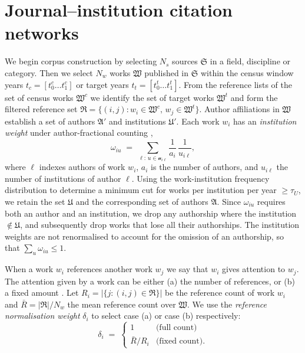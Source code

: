 \section{Journal--institution citation networks}
\label{sec:networks}

We begin corpus construction by selecting $N_s$ sources $\mathfrak{S}$ in a field, discipline or category.
Then we select $N_w$ works $\mathfrak{W}$ published in $\mathfrak{S}$ within the census
window years $t_c = [t^c_0 \ldots t^c_1]$ or target years $t_t = [t^t_0 \ldots t^t_1]$.
From the reference lists of the set of census works $\mathfrak{W}^c$ we identify the set of target works $\mathfrak{W}^t$ and form the filtered reference set $\mathfrak{R}=\{(i,j):w_i\in\mathfrak{W}^c,\,w_j\in\mathfrak{W}^t\}$.
Author affiliations in $\mathfrak{W}$ establish a set of authors $\mathfrak{A}'$ and institutions $\mathfrak{U}'$. 
Each work $w_i$ has an \textit{institution weight} under author-fractional counting
\citep{waltmanFieldnormalizedCitationImpact2015},
\begin{equation}
  \omega_{i u} \;=\;
  \sum_{\ell:\,u\in\mathcal{u}_{i\ell}}
  \frac{1}{a_i}\,\frac{1}{u_{i\ell}},
  \label{eq:omega}
\end{equation}
where $\ell$ indexes authors of work $w_i$, $a_i$ is the number of authors, and $u_{i\ell}$ the number of
institutions of author $\ell$. Using the work-institution frequency distribution to determine a minimum cut for works per institution per year $\geq\tau_U$, we retain the set $\mathfrak{U}$ and the corresponding set of authors $\mathfrak{A}$. Since $\omega_{iu}$ requires both an author and an institution, we drop any authorship where the institution $\notin\mathfrak{U}$, and subsequently drop works that lose all their authorships. The institution weights are not renormalised to account for the omission of an authorship, so that $\sum_u\omega_{iu}\leq 1$.

When a work $w_i$ references another work $w_j$ we say that $w_i$ gives attention to $w_j$. The attention given by a work can be either (a) the number of references, or (b) a fixed amount \citep{zittModifyingJournalImpact2008}. Let $R_i=|\{j:(i,j)\in\mathfrak{R}\}|$ be the reference count of work $w_i$ and $\bar{R}=|\mathfrak{R}|/N_w$ the mean reference count over $\mathfrak{W}$. We use the \textit{reference normalisation weight} $\delta_i$ to select case (a) or case (b) respectively:
\begin{equation}
	\delta_i \;=\;
	\begin{cases}
		 1 & \text{(full count)} \\
		\bar{R}/R_i & \text{(fixed count).}
	\end{cases}
	\label{eq:delta}
\end{equation}

